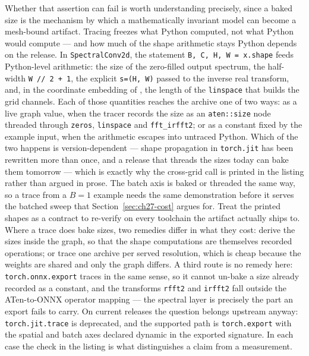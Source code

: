 Whether that assertion can fail is worth understanding precisely, since a baked size is the
mechanism by which a mathematically invariant model can become a mesh-bound
artifact. Tracing freezes what Python computed, not what Python would compute ---
and how much of the shape arithmetic stays Python depends on the release. In
\texttt{SpectralConv2d}, the statement \texttt{B, C, H, W = x.shape} feeds
Python-level arithmetic: the size of the zero-filled output spectrum, the
half-width \texttt{W // 2 + 1}, the explicit \texttt{s=(H, W)} passed to the
inverse real transform, and, in the coordinate embedding of
, the length of the
\texttt{linspace} that builds the grid channels. Each of those quantities
reaches the archive one of two ways: as a live graph value, when the tracer
records the size as an \texttt{aten::size} node threaded through
\texttt{zeros}, \texttt{linspace} and \texttt{fft\_irfft2}; or as a constant
fixed by the example input, when the arithmetic escapes into untraced
Python. Which of the two happens is version-dependent
--- shape propagation in \texttt{torch.jit} has been rewritten more than once,
and a release that threads the sizes today can bake them tomorrow --- which is
exactly why the cross-grid call is printed in the listing rather than argued in
prose. The batch axis is baked or threaded the same way, so a trace from a $B=1$
example needs the same demonstration before it serves the batched sweep that
Section~\ref{sec:ch27-cost} argues for. Treat the printed shapes as a contract to
re-verify on every toolchain the artifact actually ships to. Where a trace does
bake sizes, two remedies differ in what they cost: derive the sizes inside the
graph, so that the shape computations are themselves recorded operations; or
trace one archive per served resolution, which is cheap because the weights are
shared and only the graph differs. A third route is no remedy here:
\texttt{torch.onnx.export} traces in the same sense, so it cannot un-bake a size
already recorded as a constant, and the transforms \texttt{rfft2} and
\texttt{irfft2} fall outside the ATen-to-ONNX operator mapping --- the spectral
layer is precisely the part an export fails to carry. On current releases the
question belongs upstream anyway: \texttt{torch.jit.trace} is deprecated, and
the supported path is \texttt{torch.export} with the spatial and batch axes
declared dynamic in the exported signature. In each case the check in the
listing is what distinguishes a claim from a measurement.

